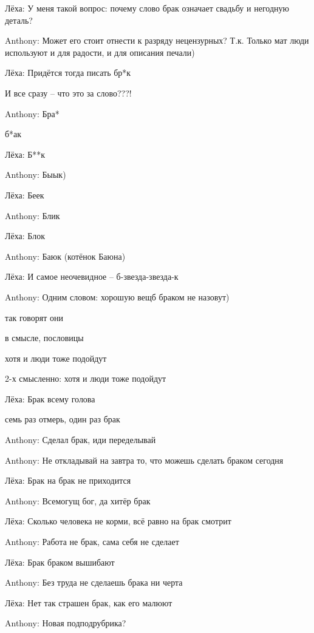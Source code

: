 \begin{miamalist}
  \item[Лёха:] У меня такой вопрос: почему слово брак означает свадьбу и негодную деталь?

  \item[Anthony:] Может его стоит отнести к разряду нецензурных? Т.к. Только мат люди используют и для радости, и для описания печали)

  \item[Лёха:] Придётся тогда писать бр*к

  И все сразу -- что это за слово???!

  \item[Anthony:] Бра*

  б*ак

  \item[Лёха:] Б**к
  \item[Anthony:] Быык)
  \item[Лёха:] Беек
  \item[Anthony:] Блик
  \item[Лёха:] Блок
  \item[Anthony:] Баюк (котёнок Баюна)
  \item[Лёха:] И самое неочевидное -- б-звезда-звезда-к
  \item[Anthony:] Одним словом: хорошую вещб браком не назовут)

  так говорят они

  в смысле, пословицы

  хотя и люди тоже подойдут

  2-х смысленно: хотя и люди тоже подойдут
  \item[Лёха:] Брак всему голова

  семь раз отмерь, один раз брак
  \item[Anthony:] Сделал брак, иди переделывай
  \item[Anthony:] Не откладывай на завтра то, что можешь сделать браком сегодня
  \item[Лёха:] Брак на брак не приходится
  \item[Anthony:] Всемогущ бог, да хитёр брак
  \item[Лёха:] Сколько человека не корми, всё равно на брак смотрит
  \item[Anthony:] Работа не брак, сама себя не сделает
  \item[Лёха:] Брак браком вышибают
  \item[Anthony:] Без труда не сделаешь брака ни черта
  \item[Лёха:] Нет так страшен брак, как его малюют
  \item[Anthony:] Новая подподрубрика?


\end{miamalist}
